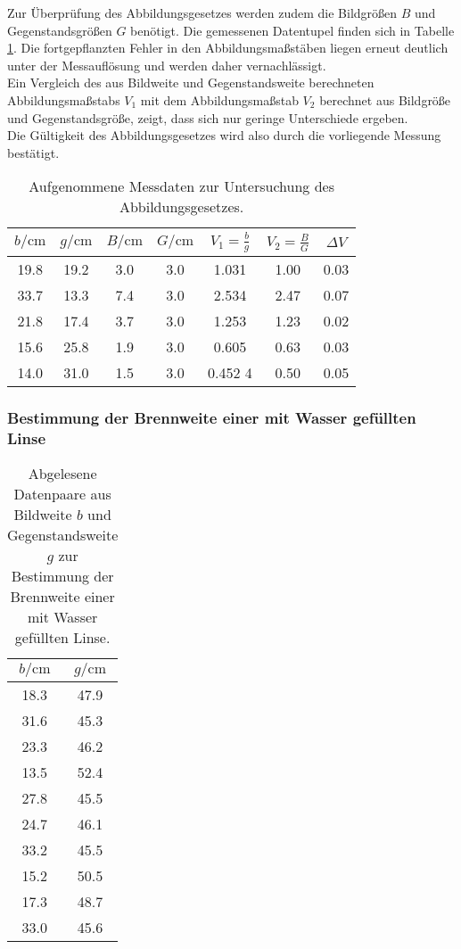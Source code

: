 Zur Überprüfung des Abbildungsgesetzes werden zudem die Bildgrößen $B$ und Gegenstandsgrößen $G$ benötigt. Die gemessenen Datentupel finden sich in Tabelle \ref{tab:groesse}. Die fortgepflanzten Fehler in den Abbildungsmaßstäben liegen erneut deutlich unter der Messauflösung und werden daher vernachlässigt.\\
Ein Vergleich des aus  Bildweite und Gegenstandsweite berechneten Abbildungsmaßstabs $V_\mathrm{1}$ mit dem Abbildungsmaßstab $V_\mathrm{2}$ berechnet aus Bildgröße und Gegenstandsgröße, zeigt, dass sich nur geringe Unterschiede ergeben.
\\Die Gültigkeit des Abbildungsgesetzes wird also durch die vorliegende Messung bestätigt.
\begin{table}
  \caption{Aufgenommene Messdaten zur Untersuchung des Abbildungsgesetzes.}
  \label{tab:groesse}
  \centering
\begin{tabular}{ccccccc}
  \toprule
  $b/\si{\centi\meter} $& $g/\si{\centi\meter} $& $B/\si{\centi\meter} $& $G/\si{\centi\meter}$ &$ V_{\mathrm{1}}=\frac{b}{g}$ & $V_\mathrm{2}=\frac{B}{G}$ & $\Delta V$ \\
\midrule
  19.8 & 19.2& 3.0& 3.0 & 1.031 & 1.00 & 0.03 \\
  33.7 & 13.3 & 7.4& 3.0 & 2.534  & 2.47 & 0.07  \\
  21.8 & 17.4 & 3.7& 3.0 & 1.253  & 1.23 & 0.02  \\
  15.6  & 25.8  & 1.9& 3.0 & 0.605& 0.63 & 0.03  \\
  14.0 & 31.0 & 1.5 & 3.0 & 0.452 4 & 0.50 & 0.05 \\
\bottomrule
\end{tabular}
\end{table}


\FloatBarrier
\subsubsection{Bestimmung der Brennweite einer mit Wasser gefüllten Linse}


\begin{table}
	\caption{Abgelesene Datenpaare aus Bildweite $b$ und Gegenstandsweite $g$ zur Bestimmung der Brennweite einer mit Wasser gefüllten Linse.}
	\label{tab:hquer}
	\centering
	\begin{tabular}{cc}
		\toprule
		$b/\si{\centi\meter}$ & $g/\si{\centi\meter}$ \\
	\midrule
		18.3 & 47.9 \\
		31.6 & 45.3 \\
		23.3 & 46.2 \\
		13.5 & 52.4 \\
		27.8 & 45.5 \\
		24.7 & 46.1 \\
		33.2 & 45.5 \\
		15.2 & 50.5 \\
		17.3 & 48.7 \\
		33.0 & 45.6 \\
	\bottomrule
	\end{tabular}
\end{table}

